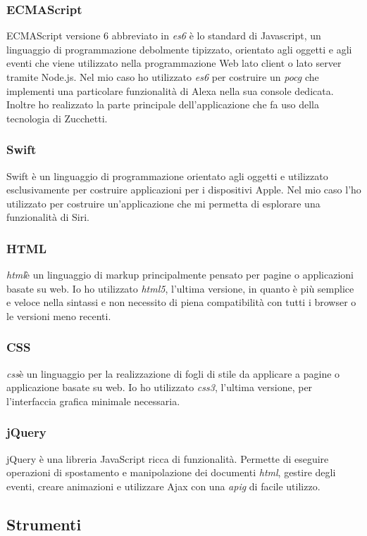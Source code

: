 		\subsubsection{ECMAScript}
		ECMAScript versione 6 abbreviato in \emph{\gls{es6}} è lo standard di Javascript, un linguaggio di programmazione debolmente tipizzato, orientato agli oggetti e agli eventi che viene utilizzato nella programmazione Web lato client o lato server tramite Node.js. Nel mio caso ho utilizzato \emph{\gls{es6}} per costruire un \emph{\gls{pocg}} che implementi una particolare funzionalità di Alexa nella sua console dedicata. Inoltre ho realizzato la parte principale dell'applicazione che fa uso della tecnologia di Zucchetti.
		\subsubsection{Swift}
		Swift è un linguaggio di programmazione orientato agli oggetti e utilizzato esclusivamente per costruire applicazioni per i dispositivi Apple. Nel mio caso l'ho utilizzato per costruire un'applicazione che mi permetta di esplorare una funzionalità di Siri.
		\subsubsection{HTML}
		\emph{\gls{html}}\glsfirstoccur è un linguaggio di markup principalmente pensato per pagine o applicazioni basate su web. Io ho utilizzato \emph{\gls{html}5}, l'ultima versione, in quanto è più semplice e veloce nella sintassi e non necessito di piena compatibilità con tutti i browser o le versioni meno recenti.
		\subsubsection{CSS}
		\emph{\gls{css}}\glsfirstoccur è un linguaggio per la realizzazione di fogli di stile da applicare a pagine o applicazione basate su web. Io ho utilizzato \emph{\gls{css}3}, l'ultima versione, per l'interfaccia grafica minimale necessaria.
		\subsubsection{jQuery}
		jQuery è una libreria JavaScript ricca di funzionalità. Permette di eseguire operazioni di spostamento e manipolazione dei documenti \emph{\gls{html}}, gestire degli eventi, creare animazioni e utilizzare Ajax con una \emph{\gls{apig}} di facile utilizzo.
	\subsection{Strumenti}
